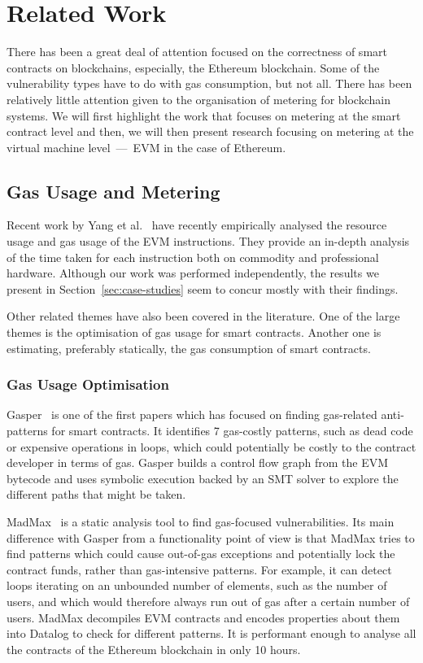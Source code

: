 \section{Related Work}
\label{sec:related}

There has been a great deal of attention focused on the correctness of smart contracts on blockchains, especially, the Ethereum blockchain. Some of the vulnerability types have to do with gas consumption, but not all. There has been relatively little attention given to the organisation of metering for blockchain systems. We will first highlight the work that focuses on metering at the smart contract level and then, we will then present research focusing on metering at the virtual machine level~---~EVM in the case of Ethereum.

\subsection{Gas Usage and Metering}
Recent work by Yang et al.~\cite{DBLP:journals/corr/abs-1905-00553} have recently empirically analysed the resource usage and gas usage of the EVM instructions.
They provide an in-depth analysis of the time taken for each instruction both on commodity and professional hardware. Although our work was performed independently, the results we present in Section~\ref{sec:case-studies} seem to concur mostly with their findings.

Other related themes have also been covered in the literature. One of the large themes is the optimisation of gas usage for smart contracts. Another one is estimating, preferably statically, the gas consumption of smart contracts.

\subsubsection*{Gas Usage Optimisation}
Gasper~\cite{Chen2017} is one of the first papers which has focused on finding gas-related anti-patterns for smart contracts. It identifies 7 gas-costly patterns, such as dead code or expensive operations in loops, which could potentially be costly to the contract developer in terms of gas. Gasper builds a control flow graph from the EVM bytecode and uses symbolic execution backed by an SMT solver to explore the different paths that might be taken.

MadMax~\cite{Grech2018} is a static analysis tool to find gas-focused vulnerabilities. Its main difference with Gasper from a functionality point of view is that MadMax tries to find patterns which could cause out-of-gas exceptions and potentially lock the contract funds, rather than gas-intensive patterns. For example, it can detect loops iterating on an unbounded number of elements, such as the number of users, and which would therefore always run out of gas after a certain number of users. MadMax decompiles EVM contracts and encodes properties about them into Datalog to check for different patterns. It is performant enough to analyse all the contracts of the Ethereum blockchain in only 10 hours.


